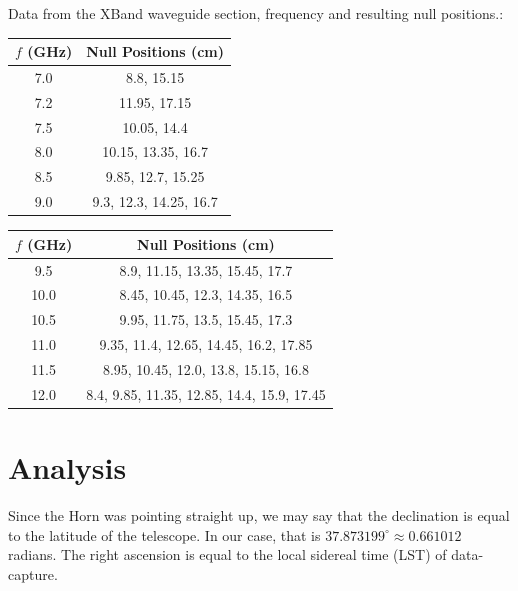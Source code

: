 \documentclass[12pt]{article}
\begin{document}



Data from the XBand waveguide section, frequency and resulting null positions.:

\begin{center}
 \begin{tabular}{||c c||} 
 \hline
 $f$ (GHz) & Null Positions (cm)\\ [0.5ex] 
 \hline
 7.0 & 8.8, 15.15 \\ 
 \hline
 7.2 & 11.95, 17.15 \\
 \hline
 7.5 & 10.05, 14.4 \\ 
 \hline
 8.0 & 10.15, 13.35, 16.7 \\
 \hline
 8.5 & 9.85, 12.7, 15.25 \\
 \hline 
 9.0 & 9.3, 12.3, 14.25, 16.7 \\ [1ex] 
 \hline
\end{tabular}
 \begin{tabular}{||c c||} 
 \hline
 $f$ (GHz) & Null Positions (cm)\\ [0.5ex] 
 \hline
 9.5 & 8.9, 11.15, 13.35, 15.45, 17.7 \\ 
 \hline
 10.0 & 8.45, 10.45, 12.3, 14.35, 16.5 \\
 \hline
 10.5 & 9.95, 11.75, 13.5, 15.45, 17.3 \\
 \hline
 11.0 & 9.35, 11.4, 12.65, 14.45, 16.2, 17.85 \\
 \hline
 11.5 & 8.95, 10.45, 12.0, 13.8, 15.15, 16.8 \\
 \hline
 12.0 & 8.4, 9.85, 11.35, 12.85, 14.4, 15.9, 17.45 \\ [1ex] 
 \hline
\end{tabular}
\end{center}

\section{Analysis}




Since the Horn was pointing straight up, we may say that the declination is equal to the latitude of the telescope. In our case, that is $37.873199^\circ \approx 0.661012$ radians. The right ascension is equal to the local sidereal time (LST) of data-capture.
\end{document}
